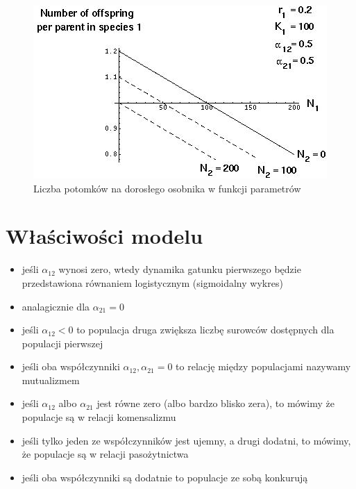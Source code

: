 \begin{figure}
	\centering
	\includegraphics[width=\textwidth]{img/Fig1}
	\caption{Liczba potomków na dorosłego osobnika w funkcji parametrów}
\end{figure}

\section{Właściwości modelu}

\begin{itemize}[itemsep=0em]
	\item jeśli $\alpha_{12}$ wynosi zero, wtedy dynamika gatunku pierwszego będzie przedstawiona równaniem logistycznym (sigmoidalny wykres) 
	
	\item analagicznie dla $\alpha_{21} = 0$
	
	\item jeśli $\alpha_{12} < 0$ to populacja druga zwiększa liczbę surowców dostępnych dla populacji pierwszej
	
	\item jeśli oba współczynniki $\alpha_{12},\alpha_{21} = 0$ to relację między populacjami nazywamy mutualizmem
	
	\item jeśli $\alpha_{12}$ albo $\alpha_{21}$ jest równe zero (albo bardzo blisko zera), to mówimy że populacje są w relacji komensalizmu
	
	\item jeśli tylko jeden ze współczynników jest ujemny, a drugi dodatni, to mówimy, że populacje są w relacji pasożytnictwa
	
	\item jeśli oba współczynniki są dodatnie to populacje ze sobą konkurują
	
\end{itemize}

